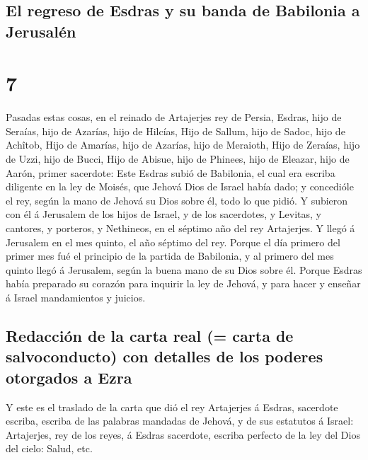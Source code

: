 \hypertarget{el-regreso-de-esdras-y-su-banda-de-babilonia-a-jerusaluxe9n}{%
\subsection{El regreso de Esdras y su banda de Babilonia a
Jerusalén}\label{el-regreso-de-esdras-y-su-banda-de-babilonia-a-jerusaluxe9n}}

\hypertarget{section-6}{%
\section{7}\label{section-6}}

 Pasadas estas cosas, en el reinado de Artajerjes rey de
Persia, Esdras, hijo de Seraías, hijo de Azarías, hijo de Hilcías,
 Hijo de Sallum, hijo de Sadoc, hijo de Achîtob,
 Hijo de Amarías, hijo de Azarías, hijo de Meraioth,
 Hijo de Zeraías, hijo de Uzzi, hijo de Bucci, 
Hijo de Abisue, hijo de Phinees, hijo de Eleazar, hijo de Aarón, primer
sacerdote:  Este Esdras subió de Babilonia, el cual era
escriba diligente en la ley de Moisés, que Jehová Dios de Israel había
dado; y concedióle el rey, según la mano de Jehová su Dios sobre él,
todo lo que pidió.  Y subieron con él á Jerusalem de los
hijos de Israel, y de los sacerdotes, y Levitas, y cantores, y porteros,
y Nethineos, en el séptimo año del rey Artajerjes.  Y llegó
á Jerusalem en el mes quinto, el año séptimo del rey. 
Porque el día primero del primer mes fué el principio de la partida de
Babilonia, y al primero del mes quinto llegó á Jerusalem, según la buena
mano de su Dios sobre él.  Porque Esdras había preparado su
corazón para inquirir la ley de Jehová, y para hacer y enseñar á Israel
mandamientos y juicios.

\hypertarget{redacciuxf3n-de-la-carta-real-carta-de-salvoconducto-con-detalles-de-los-poderes-otorgados-a-ezra}{%
\subsection{Redacción de la carta real (= carta de salvoconducto) con
detalles de los poderes otorgados a
Ezra}\label{redacciuxf3n-de-la-carta-real-carta-de-salvoconducto-con-detalles-de-los-poderes-otorgados-a-ezra}}

 Y este es el traslado de la carta que dió el rey
Artajerjes á Esdras, sacerdote escriba, escriba de las palabras mandadas
de Jehová, y de sus estatutos á Israel:  Artajerjes, rey de
los reyes, á Esdras sacerdote, escriba perfecto de la ley del Dios del
cielo: Salud, etc.

